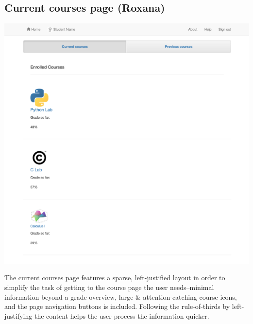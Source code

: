 \subsection{Current courses page (Roxana)}

\includegraphics[width=.75\textwidth]{screenshots/CurrentCourses.png}

The current courses page features a sparse, left-justified layout in order to simplify the task of getting to the course page the user needs--minimal information beyond a grade overview, large \& attention-catching course icons, and the page navigation buttons is included. Following the rule-of-thirds by left-justifying the content helps the user process the information quicker.

